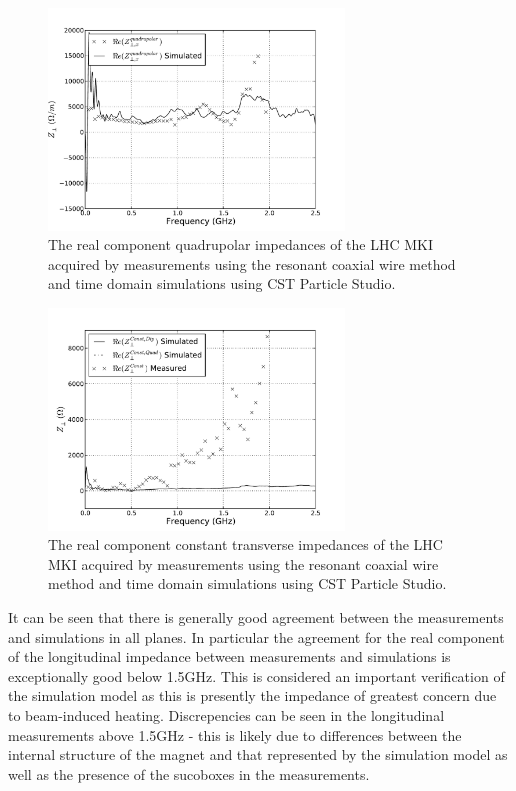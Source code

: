 \begin{figure}
\begin{center}
\includegraphics[width=0.7\textwidth]{LHC_MKI/figures/mki_15_sims_meas_quad_horz.pdf}
\end{center}
\caption{The real component quadrupolar impedances of the LHC MKI acquired by measurements using the resonant coaxial wire method and time domain simulations using CST Particle Studio.}
\label{fig:mki-15-quadrupolar}
\end{figure}

\begin{figure}
\begin{center}
\includegraphics[width=0.7\textwidth]{LHC_MKI/figures/mki_15_sims_meas_const.pdf}
\end{center}
\caption{The real component constant transverse impedances of the LHC MKI acquired by measurements using the resonant coaxial wire method and time domain simulations using CST Particle Studio.}
\label{fig:mki-15-constant}
\end{figure}


It can be seen that there is generally good agreement between the measurements and simulations in all planes. In particular the agreement for the real component of the longitudinal impedance between measurements and simulations is exceptionally good below 1.5GHz. This is considered an important verification of the simulation model as this is presently the impedance of greatest concern due to beam-induced heating. Discrepencies can be seen in the longitudinal measurements above 1.5GHz - this is likely due to differences between the internal structure of the magnet and that represented by the simulation model as well as the presence of the sucoboxes in the measurements.

